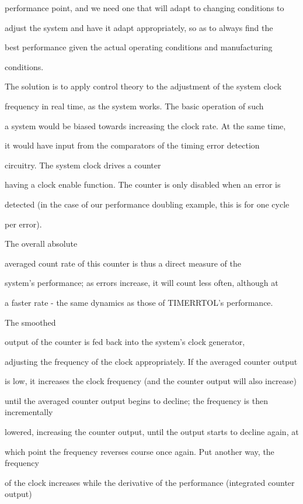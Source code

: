 \documentclass[12pt,dvips]{article}
\begin{document}
performance point, and we need one that will adapt to changing conditions to

adjust the system and have it adapt appropriately, so as to always find the

best performance given the actual operating conditions and manufacturing

conditions.



The solution is to apply control theory to the adjustment of the system clock

frequency in real time, as the system works. The basic operation of such

a system would be biased towards increasing the clock rate. At the same time,

it would have input from the comparators of the timing error detection

circuitry. The system clock drives a counter

having a clock enable function. The counter is only disabled when an error is

detected (in the case of our performance doubling example, this is for one cycle

per error).

The overall absolute

averaged count rate of this counter is thus a direct measure of the

system's performance; as errors increase, it will count less often, although at

a faster rate - the same dynamics as those of TIMERRTOL's performance.



The smoothed

output of the counter is fed back into the system's clock generator,

adjusting the frequency of the clock appropriately. If the averaged counter output

is low, it increases the clock frequency (and the counter output will also increase)

until the averaged counter output begins to decline; the frequency is then incrementally

lowered, increasing the counter output, until the output starts to decline again, at

which point the frequency reverses course once again. Put another way, the frequency

of the clock increases while the derivative of the performance (integrated counter output)
\end{document}
